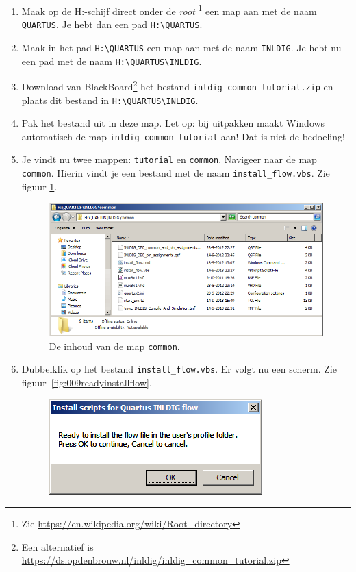 \documentclass[a4paper,12pt,fleqn,twoside]{book}
\def\tutpicscale{0.455}
\begin{document}
\begin{enumerate}\itemsep-1pt
\item Maak op de H:-schijf direct onder de \textsl{root}%
      \footnote{Zie \url{https://en.wikipedia.org/wiki/Root_directory}} een map
      aan met de naam \lstinline|QUARTUS|. Je hebt dan een pad
      \lstinline|H:\QUARTUS|.
\item Maak in het pad \lstinline|H:\QUARTUS| een map aan met de naam
      \lstinline|INLDIG|. Je hebt nu een pad met de naam
      \lstinline|H:\QUARTUS\INLDIG|.
\item Download van BlackBoard\footnote{Een alternatief is
      \url{https://ds.opdenbrouw.nl/inldig/inldig_common_tutorial.zip}} het
      bestand \lstinline|inldig_common_tutorial.zip| en plaats dit bestand in
      \lstinline|H:\QUARTUS\INLDIG|. 
\item Pak het bestand uit in deze map. Let op: bij uitpakken maakt Windows
      automatisch de map \lstinline|inldig_common_tutorial| aan! Dat is niet
      de bedoeling!
\item Je vindt nu twee mappen: \lstinline|tutorial| en \lstinline|common|.
      Navigeer naar de map \lstinline|common|. Hierin vindt je een bestand met
      de naam \lstinline|install_flow.vbs|. Zie figuur \ref{fig:008commonmap}.
\begin{figure}[H]
\centering
\includegraphics[scale=\tutpicscale]{008commonmap}
\caption{De inhoud van de map \lstinline|common|.}
\label{fig:008commonmap}
\end{figure}
\item Dubbelklik op het bestand \lstinline|install_flow.vbs|. Er volgt nu een scherm.
Zie figuur~\ref{fig:009readyinstallflow}.
\begin{figure}[H]
\centering
\includegraphics[scale=\tutpicscale]{009readyinstallflow}

\end{figure}
\end{enumerate}
\end{document}
